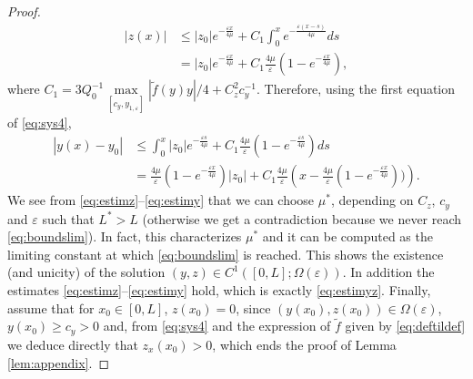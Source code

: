 \documentclass[10pt,a4paper]{amsart}
\begin{document}
\begin{proof}
\begin{equation}
\label{eq:estimz}
\begin{split}
    |z(x)| &\leq |z_{0}| e^{-\frac{\varepsilon x}{4\mu}}+C_{1}\int_{0}^{x}e^{-\frac{\varepsilon (x-s)}{4\mu}} ds \\&= |z_{0}| e^{-\frac{\varepsilon x}{4\mu}}+ C_{1}\frac{4\mu}{\varepsilon}(1-e^{-\frac{\varepsilon x}{4\mu}}),
\end{split}
\end{equation}
where $C_{1} = 3Q_{0}^{-1}\max\limits_{[c_{y},y_{1,\varepsilon}]}|\tilde{f}(y)y|/4+ C_{z}^{2}c_{y}^{-1}$. 
Therefore, using the first equation of \eqref{eq:sys4},
\begin{equation}
\label{eq:estimy}
\begin{split}
|y(x) - y_{0}| &\leq \int_{0}^{x} |z_{0}| e^{-\frac{\varepsilon s}{4\mu}}+ C_{1}\frac{4\mu}{\varepsilon}(1-e^{-\frac{\varepsilon s}{4\mu}}) ds\\
&= \frac{4\mu}{\varepsilon}\left(1-e^{-\frac{\varepsilon x}{4\mu}}\right)|z_{0}|  + C_{1}\frac{4\mu}{\varepsilon}\left(x-\frac{4\mu}{\varepsilon}(1-e^{-\frac{\varepsilon x}{4\mu}}))\right).
\end{split}
\end{equation}
We see from \eqref{eq:estimz}--\eqref{eq:estimy} that we can choose $\mu^{*}$, depending on $C_{z}$, $c_{y}$ and $\varepsilon$ such that $L^{*}>L$ (otherwise we get a contradiction because we never reach \eqref{eq:boundslim}). {In fact, this characterizes $\mu^{*}$ and it can be computed as the limiting constant at which \eqref{eq:boundslim} is reached.} 
This shows the existence (and unicity) of the solution $(y,z)\in C^{1}([0,L];\Omega(\varepsilon))$. In addition the estimates \eqref{eq:estimz}--\eqref{eq:estimy} hold, {which is exactly \eqref{eq:estimyz}. Finally, assume that for $x_{0}\in[0,L]$, $z(x_{0})=0$, since $(y(x_{0}),z(x_{0}))\in \Omega(\varepsilon)$, $y(x_{0})\geq c_{y}>0$ and, from \eqref{eq:sys4} and the expression of $\tilde{f}$ given by \eqref{eq:deftildef} we deduce directly that $z_{x}(x_{0})>0$,} which ends the proof of Lemma \ref{lem:appendix}.
\end{proof}
\end{document}
